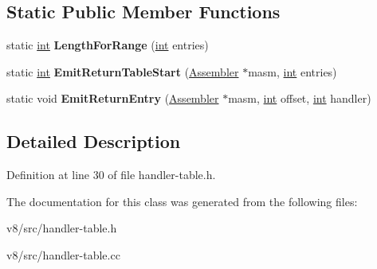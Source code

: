 \subsection*{Static Public Member Functions}
\begin{DoxyCompactItemize}
\item 
\mbox{\label{classv8_1_1internal_1_1HandlerTable_a3e307a83cb3a18ffc159bc12de0533fa}} 
static \mbox{\hyperlink{classint}{int}} {\bfseries Length\+For\+Range} (\mbox{\hyperlink{classint}{int}} entries)
\item 
\mbox{\label{classv8_1_1internal_1_1HandlerTable_a5a12039b34e165289c99eae77cb39ed7}} 
static \mbox{\hyperlink{classint}{int}} {\bfseries Emit\+Return\+Table\+Start} (\mbox{\hyperlink{classv8_1_1internal_1_1Assembler}{Assembler}} $\ast$masm, \mbox{\hyperlink{classint}{int}} entries)
\item 
\mbox{\label{classv8_1_1internal_1_1HandlerTable_a49c7ed76a08c7e7133ef5f6137b91793}} 
static void {\bfseries Emit\+Return\+Entry} (\mbox{\hyperlink{classv8_1_1internal_1_1Assembler}{Assembler}} $\ast$masm, \mbox{\hyperlink{classint}{int}} offset, \mbox{\hyperlink{classint}{int}} handler)
\end{DoxyCompactItemize}


\subsection{Detailed Description}


Definition at line 30 of file handler-\/table.\+h.



The documentation for this class was generated from the following files\+:\begin{DoxyCompactItemize}
\item 
v8/src/handler-\/table.\+h\item 
v8/src/handler-\/table.\+cc\end{DoxyCompactItemize}
